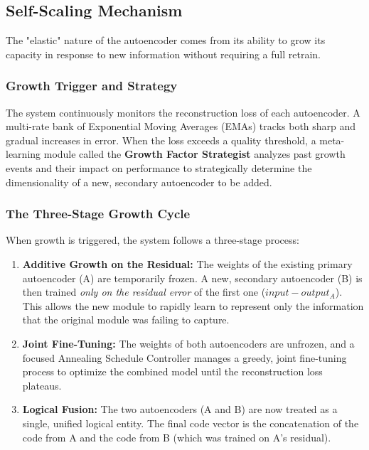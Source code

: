 \documentclass{article}
\begin{document}
\subsection{Self-Scaling Mechanism}
The "elastic" nature of the autoencoder comes from its ability to grow its capacity in response to new information without requiring a full retrain.

\subsubsection{Growth Trigger and Strategy}
The system continuously monitors the reconstruction loss of each autoencoder. A multi-rate bank of Exponential Moving Averages (EMAs) tracks both sharp and gradual increases in error. When the loss exceeds a quality threshold, a meta-learning module called the \textbf{Growth Factor Strategist} analyzes past growth events and their impact on performance to strategically determine the dimensionality of a new, secondary autoencoder to be added.

\subsubsection{The Three-Stage Growth Cycle}
When growth is triggered, the system follows a three-stage process:
\begin{enumerate}
    \item \textbf{Additive Growth on the Residual:} The weights of the existing primary autoencoder (A) are temporarily frozen. A new, secondary autoencoder (B) is then trained \textit{only on the residual error} of the first one ($input - output_A$). This allows the new module to rapidly learn to represent only the information that the original module was failing to capture.
    \item \textbf{Joint Fine-Tuning:} The weights of both autoencoders are unfrozen, and a focused Annealing Schedule Controller manages a greedy, joint fine-tuning process to optimize the combined model until the reconstruction loss plateaus.
    \item \textbf{Logical Fusion:} The two autoencoders (A and B) are now treated as a single, unified logical entity. The final code vector is the concatenation of the code from A and the code from B (which was trained on A's residual).
\end{enumerate}
\end{document}
